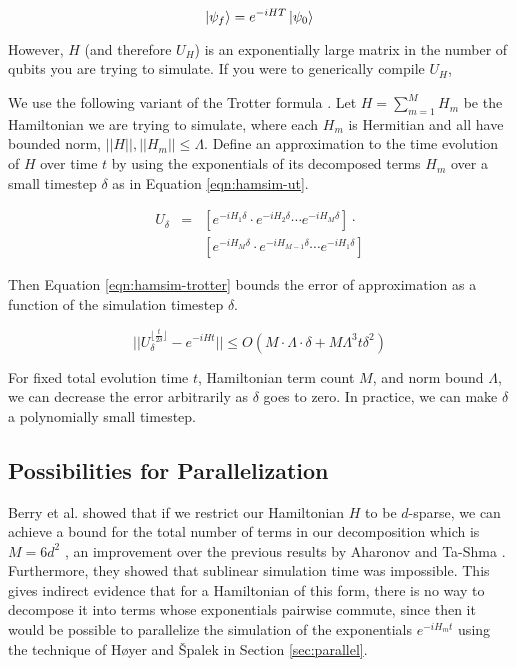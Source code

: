 \begin{equation}
\left\vert{\psi_f}\right\rangle = e^{-iHT} \left\vert{\psi_0}\right\rangle
\end{equation}

However, $H$ (and therefore $U_H$)
is an exponentially large matrix in the number of qubits you
are trying to simulate. If you were to generically compile $U_H$, 

We use the following variant of the Trotter formula \cite{Aharonov2003}.
Let $H = \sum_{m=1}^M H_m$ be the Hamiltonian we are trying to simulate, where
each $H_m$ is Hermitian and all have bounded norm, $||H||,||H_m|| \le \Lambda$.
Define an approximation to the time evolution of $H$ over time $t$ by using the
exponentials of its decomposed terms $H_m$ over a small
timestep $\delta$ as in Equation
\ref{eqn:hamsim-ut}.

\begin{eqnarray}
U_\delta & = & [e^{-iH_1 \delta}\cdot e^{-iH_2 \delta} \cdots e^{-iH_M \delta}]\cdot\\
         &   & [e^{-iH_M \delta}\cdot e^{-iH_{M-1} \delta} \cdots e^{-iH_1 \delta}]
\label{eqn:hamsim-ut}
\end{eqnarray}

Then Equation \ref{eqn:hamsim-trotter} bounds the error of approximation
as a function of the simulation timestep $\delta$.

\begin{equation}
||U_{\delta}^{\lfloor \frac{t}{2\delta} \rfloor} - e^{-iHt}||
\le O(M\cdot\Lambda \cdot \delta + M\Lambda^3 t \delta^2)
\label{eqn:hamsim-trotter}
\end{equation}

For fixed total evolution time $t$, Hamiltonian term count $M$,
and norm bound $\Lambda$, we can decrease the error arbitrarily as
$\delta$ goes to zero. In practice, we can make $\delta$ a polynomially
small timestep.

\subsection{Possibilities for Parallelization}

Berry et al. showed that if we restrict our Hamiltonian $H$ to be
$d$-sparse, we can achieve a bound for the total
number of terms in our decomposition which is $M=6d^2$ \cite{Berry2005},
an improvement over the previous results by Aharonov and Ta-Shma
\cite{Aharonov2003}.
Furthermore, they showed that sublinear simulation time was impossible.
This gives indirect evidence that for a Hamiltonian of this form,
there is no way to decompose it into terms whose exponentials
pairwise commute, since then
it would be possible to parallelize the simulation of the
exponentials $e^{-iH_m t}$ using
the technique of H{\o}yer and {\v S}palek in
Section \ref{sec:parallel}.

